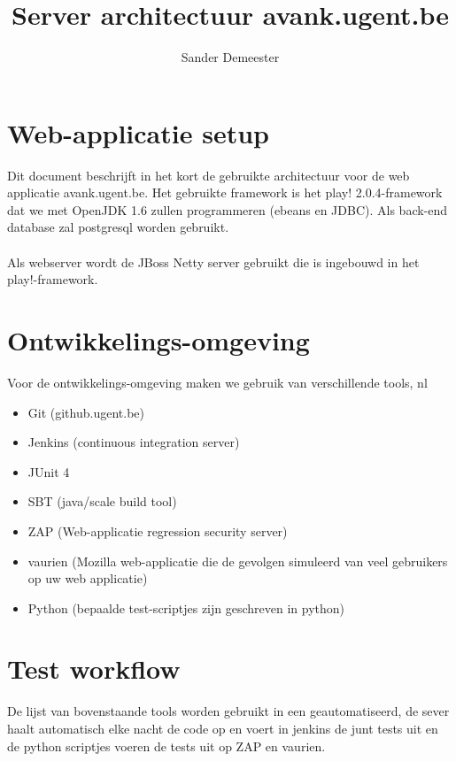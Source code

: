 \documentclass[10pt,a4paper]{report}
\author{Sander Demeester}
\begin{document}
\title{Server architectuur avank.ugent.be}
\section*{Web-applicatie setup}
Dit document beschrijft in het kort de gebruikte architectuur voor de web applicatie avank.ugent.be.
Het gebruikte framework is het play! 2.0.4-framework dat we met OpenJDK 1.6 zullen programmeren  (ebeans en JDBC). Als back-end database zal postgresql worden gebruikt.\\
\\
Als webserver wordt de JBoss Netty server gebruikt die is ingebouwd in het play!-framework.
\section*{Ontwikkelings-omgeving}
Voor de ontwikkelings-omgeving maken we gebruik van verschillende tools, nl
\begin{itemize}
\item Git (github.ugent.be)
\item Jenkins (continuous integration server)
\item JUnit 4
\item SBT (java/scale build tool)
\item ZAP (Web-applicatie regression security server)
\item vaurien (Mozilla web-applicatie die de gevolgen simuleerd van veel gebruikers op uw web applicatie)
\item Python (bepaalde test-scriptjes zijn geschreven in python)
\end{itemize}
\section*{Test workflow}
De lijst van bovenstaande tools worden gebruikt in een geautomatiseerd, de sever haalt automatisch elke nacht de code op en voert in jenkins de junt tests uit en de python scriptjes voeren de tests uit op ZAP en vaurien.
\end{document}
